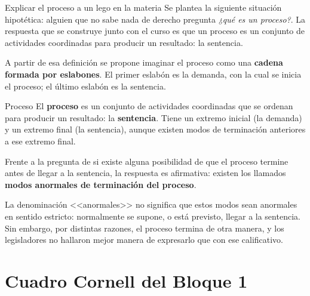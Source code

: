 \documentclass[12pt,oneside]{book}
\begin{document}
\begin{example}{Explicar el proceso a un lego en la materia}
Se plantea la siguiente situación hipotética: alguien que no sabe nada de derecho pregunta \textit{¿qué es un proceso?}. La respuesta que se construye junto con el curso es que un proceso es un conjunto de actividades coordinadas para producir un resultado: la sentencia.

A partir de esa definición se propone imaginar el proceso como una \textbf{cadena formada por eslabones}. El primer eslabón es la demanda, con la cual se inicia el proceso; el último eslabón es la sentencia.
\end{example}

\begin{definition}{Proceso}
El \textbf{proceso} es un conjunto de actividades coordinadas que se ordenan para producir un resultado: la \textbf{sentencia}. Tiene un extremo inicial (la demanda) y un extremo final (la sentencia), aunque existen modos de terminación anteriores a ese extremo final.
\end{definition}

Frente a la pregunta de si existe alguna posibilidad de que el proceso termine antes de llegar a la sentencia, la respuesta es afirmativa: existen los llamados \textbf{modos anormales de terminación del proceso}.

\begin{note}
La denominación <<anormales>> no significa que estos modos sean anormales en sentido estricto: normalmente se supone, o está previsto, llegar a la sentencia. Sin embargo, por distintas razones, el proceso termina de otra manera, y los legisladores no hallaron mejor manera de expresarlo que con ese calificativo.
\end{note}

\clearpage
\section{Cuadro Cornell del Bloque 1}
\end{document}
